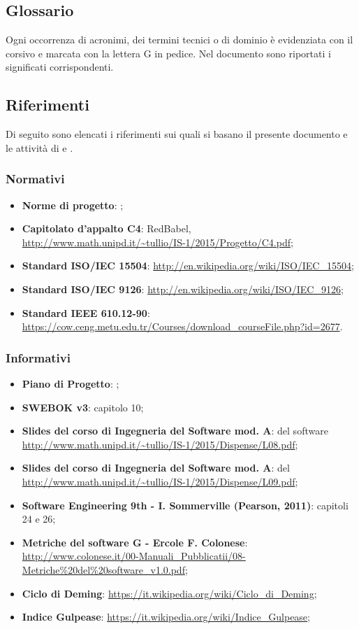 \subsection{Glossario}
Ogni occorrenza di acronimi, dei termini tecnici o di dominio è evidenziata con il corsivo e marcata con la lettera G in pedice. Nel documento \Glossario sono riportati i significati corrispondenti.

\subsection{Riferimenti}
Di seguito  sono elencati i riferimenti sui quali si basano il presente documento e le attività di  e .

\subsubsection{Normativi}
\begin{itemize}
\item \textbf{Norme di progetto}: \NormeDiProgetto;
\item \textbf{Capitolato d'appalto C4}: RedBabel,  \url{http://www.math.unipd.it/~tullio/IS-1/2015/Progetto/C4.pdf};
\item \textbf{Standard ISO/IEC 15504}: \url{http://en.wikipedia.org/wiki/ISO/IEC_15504};
\item \textbf{Standard ISO/IEC 9126}: \url{http://en.wikipedia.org/wiki/ISO/IEC_9126};
\item \textbf{Standard IEEE 610.12-90}: \url{https://cow.ceng.metu.edu.tr/Courses/download_courseFile.php?id=2677}.
\end{itemize}
	
\subsubsection{Informativi}
\begin{itemize}
\item \textbf{Piano di Progetto}: \PianoDiProgetto;
\item \textbf{SWEBOK v3}: capitolo 10;
\item \textbf{Slides del corso di Ingegneria del Software mod. A}:  del software \url{http://www.math.unipd.it/~tullio/IS-1/2015/Dispense/L08.pdf};
\item \textbf{Slides del corso di Ingegneria del Software mod. A}:  del  \url{http://www.math.unipd.it/~tullio/IS-1/2015/Dispense/L09.pdf};
\item \textbf{Software Engineering 9th - I. Sommerville (Pearson, 2011)}: capitoli 24 e 26;
\item \textbf{Metriche del software G - Ercole F. Colonese}: \url{http://www.colonese.it/00-Manuali_Pubblicatii/08-Metriche%20del%20software_v1.0.pdf};
\item \textbf{Ciclo di Deming}: \url{https://it.wikipedia.org/wiki/Ciclo_di_Deming};
\item \textbf{Indice Gulpease}: \url{https://it.wikipedia.org/wiki/Indice_Gulpease};
\end{itemize}
